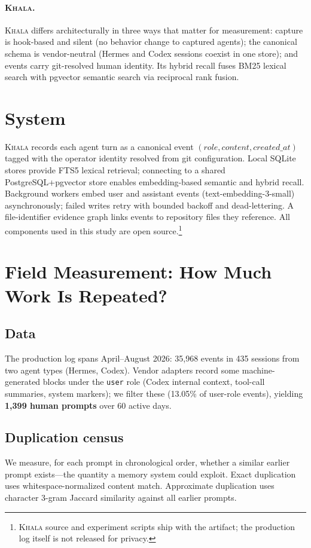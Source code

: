 \documentclass{article}
\newcommand{\khala}{\textsc{Khala}}
\begin{document}
\paragraph{\khala{}.} \khala{} differs architecturally in three ways that
matter for measurement: capture is hook-based and silent (no behavior change
to captured agents); the canonical schema is vendor-neutral (Hermes and Codex
sessions coexist in one store); and events carry git-resolved human identity.
Its hybrid recall fuses BM25 lexical search with pgvector semantic search via
reciprocal rank fusion.

\section{System}
\label{sec:system}
\khala{} records each agent turn as a canonical event
$(role, content, created\_at)$ tagged with the operator identity resolved
from git configuration. Local SQLite stores provide FTS5 lexical retrieval;
connecting to a shared PostgreSQL+pgvector store enables embedding-based
semantic and hybrid recall. Background workers embed user and assistant
events (text-embedding-3-small) asynchronously; failed writes retry with
bounded backoff and dead-lettering. A file-identifier evidence graph links
events to repository files they reference. All components used in this study
are open source.\footnote{\khala{} source and experiment scripts ship with
the artifact; the production log itself is not released for privacy.}

\section{Field Measurement: How Much Work Is Repeated?}
\label{sec:field}

\subsection{Data}
The production log spans April--August 2026: 35{,}968 events in 435 sessions
from two agent types (Hermes, Codex). Vendor adapters record some
machine-generated blocks under the \texttt{user} role (Codex internal
context, tool-call summaries, system markers); we filter these
(13.05\% of user-role events), yielding \textbf{1{,}399 human prompts} over
60 active days.

\subsection{Duplication census}
We measure, for each prompt in chronological order, whether a similar
earlier prompt exists---the quantity a memory system could exploit. Exact
duplication uses whitespace-normalized content match. Approximate
duplication uses character 3-gram Jaccard similarity against all earlier
prompts.
\end{document}
